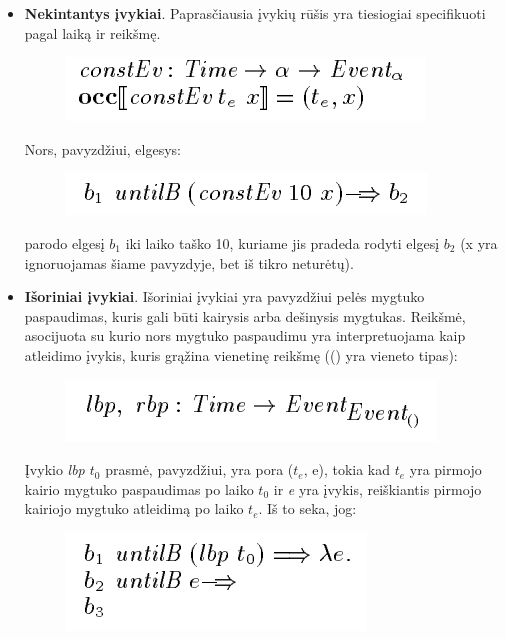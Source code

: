 \begin{itemize}
	\item \textbf{Nekintantys įvykiai}. Paprasčiausia įvykių rūšis yra tiesiogiai specifikuoti pagal laiką ir reikšmę.

\begin{figure}[H]
	\centering
	\includegraphics[scale=0.75]{pics/3.png}
	\label{pic:3}
\end{figure}

	Nors, pavyzdžiui, elgesys:

\begin{figure}[H]
	\centering
	\includegraphics[scale=0.75]{pics/4.png}
	\label{pic:4}
\end{figure}

	parodo elgesį \(b_{1}\) iki laiko taško 10, kuriame jis pradeda rodyti elgesį \(b_{2}\) (x yra ignoruojamas šiame pavyzdyje, bet iš tikro neturėtų).

	\item \textbf{Išoriniai įvykiai}. Išoriniai įvykiai yra pavyzdžiui pelės mygtuko paspaudimas, kuris gali būti kairysis arba dešinysis mygtukas. Reikšmė, asocijuota su kurio nors mygtuko paspaudimu yra interpretuojama kaip atleidimo įvykis, kuris grąžina vienetinę reikšmę (() yra vieneto tipas):

\begin{figure}[H]
	\centering
	\includegraphics[scale=0.75]{pics/5.png}
	\label{pic:5}
\end{figure}

	Įvykio \textit{lbp \(t_{0}\)} prasmė, pavyzdžiui, yra pora (\(t_{e}\), e), tokia kad \(t_{e}\) yra pirmojo kairio mygtuko paspaudimas po laiko \(t_{0}\) ir \textit{e} yra įvykis, reiškiantis pirmojo kairiojo mygtuko atleidimą po laiko \(t_{e}\). Iš to seka, jog:

\begin{figure}[H]
	\centering
	\includegraphics[scale=0.75]{pics/6.png}
	\label{pic:6}
\end{figure}


\end{itemize}
